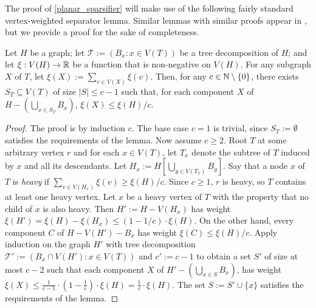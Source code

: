 \documentclass{patmorin}
\renewcommand{\ge}{\geqslant}
\renewcommand{\le}{\leqslant}
\renewcommand{\geq}{\geqslant}
\newcommand{\david}[1]{{\color{orange} David: #1}}
\newcommand{\defin}[1]{\emph{\textcolor{brightmaroon}{#1}}}
\begin{document}

The proof of \cref{planar_sparsifier} will make use of the following fairly standard vertex-weighted separator lemma.  Similar lemmas with similar proofs appear in  \citet{robertson.seymour:graph}, but we provide a proof for the sake of completeness.


\begin{lem}\label{weighted_separator}
    Let $H$ be a graph; let $\mathcal{T}:=(B_x:x\in V(T))$ be a tree decomposition of $H$; and let $\xi:V(H)\to\mathbb{R}$ be a function that is non-negative on $V(H)$.  For any subgraph $X$ of $T$, let       $\xi(X):=\sum_{v\in V(X)} \xi(v)$. Then, for any $c\in\mathbb{N}\setminus\{0\}$, there exists $S_T\subseteq V(T)$ of size $|S|\le c-1$ such that, for each component $X$ of $H-(\bigcup_{x\in S_T} B_x)$, $\xi(X)\le \xi(H)/c$.
\end{lem}

\begin{proof}
  The proof is by induction $c$.  The base case $c=1$ is trivial, since $S_T:=\emptyset$ satisfies the requirements of the lemma.  Now assume $c\ge 2$.  Root $T$ at some arbitrary vertex $r$ and for each $x\in V(T)$, let $T_x$ denote the subtree of $T$ induced by $x$ and all its descendants.  Let $H_x:=H[\bigcup_{y\in V(T_x)} B_y]$.  Say that a node $x$ of $T$ is \defin{heavy} if $\sum_{v\in V(H_x)} \xi(v) \ge \xi(H)/c$. Since $c\ge 1$, $r$ is heavy, so $T$ contains at least one heavy vertex. Let $x$ be a heavy vertex of $T$ with the property that no child of $x$ is also heavy.  Then $H':=H-V(H_x)$ has weight $\xi(H') = \xi(H)-\xi(H_x) \le (1-1/c)\cdot\xi(H)$.  On the other hand, every component $C$ of $H-V(H')-B_x$ has weight $\xi(C) \le \xi(H)/c$.  Apply induction on the graph $H'$ with tree decomposition $\mathcal{T}':=(B_x\cap V(H'):x\in V(T))$ and $c':=c-1$ to obtain a set $S'$ of size at most $c-2$ such that each component $X$ of $H'-(\bigcup_{x\in S} B_x)$, has weight $\xi(X) \le \tfrac{1}{c-1}\cdot(1-\tfrac{1}{c})\cdot\xi(H) = \tfrac{1}{c}\cdot \xi(H)$.  The set $S:=S'\cup\{x\}$ satisfies the requirements of the lemma.
\end{proof}
\end{document}
